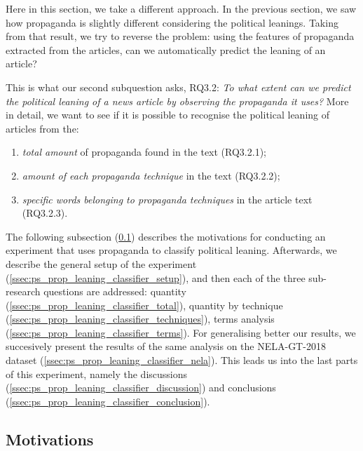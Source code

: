 Here in this section, we take a different approach.
In the previous section, we saw how propaganda is slightly different considering the political leanings.
Taking from that result, we try to reverse the problem: using the features of propaganda extracted from the articles, can we automatically predict the leaning of an article?

This is what our second subquestion asks, RQ3.2: \emph{To what extent can we predict the political leaning of a news article by observing the propaganda it uses?}
More in detail, we want to see if it is possible to recognise the political leaning of articles from the:
\begin{enumerate}
    \item \emph{total amount} of propaganda found in the text (RQ3.2.1);
    \item \emph{amount of each propaganda technique} in the text (RQ3.2.2);
    \item \emph{specific words belonging to propaganda techniques} in the article text (RQ3.2.3).
\end{enumerate}

The following subsection (\ref{ssec:ps_prop_leaning_classifier_motivations}) describes the motivations for conducting an experiment that uses propaganda to classify political leaning. Afterwards, we describe the general setup of the experiment (\ref{ssec:ps_prop_leaning_classifier_setup}), and then each of the three sub-research questions are addressed: quantity (\ref{ssec:ps_prop_leaning_classifier_total}), quantity by technique (\ref{ssec:ps_prop_leaning_classifier_techniques}), terms analysis (\ref{ssec:ps_prop_leaning_classifier_terms}).
For generalising better our results, we succesively present the results of the same analysis on the NELA-GT-2018 dataset (\ref{ssec:ps_prop_leaning_classifier_nela}).
This leads us into the last parts of this experiment, namely the discussions (\ref{ssec:ps_prop_leaning_classifier_discussion}) and conclusions (\ref{ssec:ps_prop_leaning_classifier_conclusion}).

\subsection{Motivations}
\label{ssec:ps_prop_leaning_classifier_motivations}

